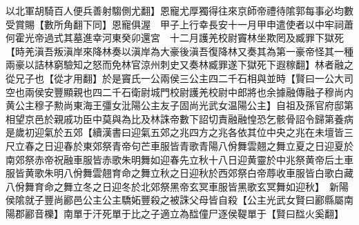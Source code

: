 以北軍胡騎百人便兵善射騶側尤翻】恩寵尤厚獨得往來京師帝禮待隂郭每事必均數受賞賜【數所角翻下同】恩寵俱渥　甲子上行幸長安十一月甲申遣使者以中牢祠蕭何霍光帝過式其墓進幸河東癸卯還宮　十二月護羌校尉竇林坐欺罔及臧罪下獄死【時羌滇吾叛滇岸來降林奏以滇岸為大豪後滇吾復降林又奏其為第一豪帝怪其一種兩豪以詰林窮驗知之怒而免林官涼州刺史又奏林臧罪遂下獄死下遐稼翻】林者融之從兄子也【從才用翻】於是竇氏一公兩侯三公主四二千石相與並時【賢曰一公大司空也兩侯安豐顯親也四二千石衛尉城門校尉護羌校尉中郎將也余據融傳融子穆尚内黄公主穆子勲尚東海王彊女沘陽公主友子固尚光武女温陽公主】自祖及孫官府邸第相望京邑於親戚功臣中莫與為比及林誅帝數下詔切責融融惶恐乞骸骨詔令歸第養病　是歲初迎氣於五郊【續漢書曰迎氣五郊之兆四方之兆各依其位中央之兆在未壇皆三尺立春之日迎春於東郊祭青帝句芒車服皆青歌青陽八佾舞雲翹之舞立夏之日迎夏於南郊祭赤帝祝融車服皆赤歌朱明舞如迎春先立秋十八日迎黄靈於中兆祭黄帝后土車服皆黄歌朱明八佾舞雲翹育命之舞立秋之日迎秋於西郊祭白帝蓐收車服皆白歌白藏八佾舞育命之舞立冬之日迎冬於北郊祭黑帝玄冥車服皆黑歌玄冥舞如迎秋】　新陽侯隂就子豐尚酈邑公主公主驕妬豐殺之被誅父母皆自殺【公主光武女賢曰酈縣屬南陽郡酈音櫟】南單于汗死單于比之子適立為䤈僮尸逐侯鞮單于【賢曰䤈火奚翻】

